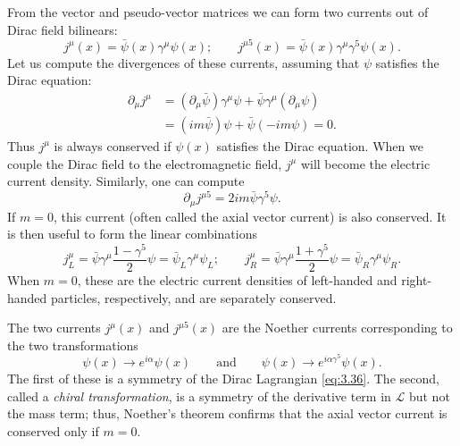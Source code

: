 From the vector and pseudo-vector matrices we can form two currents out of
Dirac field bilinears:
\begin{equation}
  j^\mu(x) = \bar{\psi}(x)\gamma^\mu\psi(x);\qquad
  j^{\mu 5}(x) = \bar{\psi}(x)\gamma^\mu\gamma^5\psi(x) .
  \label{eq:3.78}
\end{equation}
Let us compute the divergences of these currents, assuming that $\psi$
satisfies the Dirac equation:
\begin{align}
  \partial_\mu j^\mu &= (\partial_\mu\bar{\psi})\gamma^\mu\psi
    + \bar{\psi}\gamma^\mu(\partial_\mu\psi)\\
  &= (im\bar{\psi})\psi + \bar{\psi}(-im\psi) = 0 .
  \label{eq:3.79}
\end{align}
Thus $j^\mu$ is always conserved if $\psi(x)$ satisfies the Dirac equation.
When we couple the Dirac field to the electromagnetic field, $j^\mu$ will
become the electric current density.  Similarly, one can compute
\begin{equation}
  \partial_\mu j^{\mu 5} = 2im\bar{\psi}\gamma^5\psi .
  \label{eq:3.80}
\end{equation}
If $m=0$, this current (often called the axial vector current) is also
conserved.  It is then useful to form the linear combinations
\begin{equation}
  j_L^\mu = \bar{\psi}\gamma^\mu\frac{1-\gamma^5}{2}\psi
    = \bar{\psi}_L\gamma^\mu\psi_L;\qquad
  j_R^\mu = \bar{\psi}\gamma^\mu\frac{1+\gamma^5}{2}\psi
    = \bar{\psi}_R\gamma^\mu\psi_R .
  \label{eq:3.81}
\end{equation}
When $m=0$, these are the electric current densities of left-handed and
right-handed particles, respectively, and are separately conserved.

The two currents $j^\mu(x)$ and $j^{\mu 5}(x)$ are the Noether currents
corresponding to the two transformations
\begin{equation}
  \psi(x) \to e^{i\alpha}\psi(x)
  \qquad\text{and}\qquad
  \psi(x) \to e^{i\alpha\gamma^5}\psi(x) .
\end{equation}
The first of these is a symmetry of the Dirac Lagrangian \eqref{eq:3.36}.
The second, called a \emph{chiral transformation}, is a symmetry of the
derivative term in $\mathcal{L}$ but not the mass term; thus, Noether's
theorem confirms that the axial vector current is conserved only if $m=0$.

